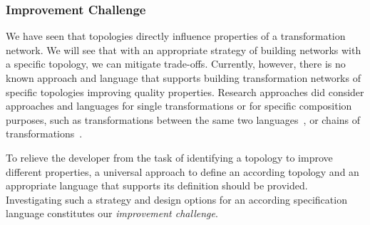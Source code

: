 \subsubsection*{Improvement Challenge}

We have seen that topologies directly influence properties of a transformation network.
We will see that with an appropriate strategy of building networks with a specific topology, we can mitigate trade-offs.
Currently, however, there is no known approach and language that supports building transformation networks of specific topologies improving quality properties.
Research approaches did consider approaches and languages for single transformations or for specific composition purposes, such as transformations between the same two languages~\cite{wagelaar2010a,wagelaar2011a}, or chains of transformations~\cite{pilgrim2008a, vanhooff2007UniTI-MODELS}.

To relieve the developer from the task of identifying a topology to improve different properties, a universal approach to define an according topology and an appropriate language that supports its definition should be provided.
Investigating such a strategy and design options for an according specification language constitutes our \emph{improvement challenge}.

